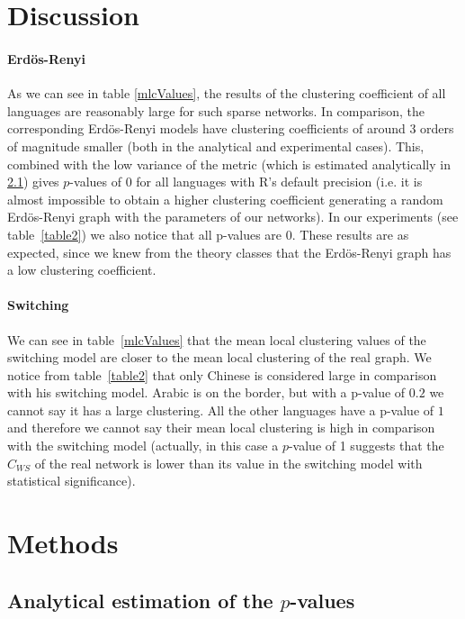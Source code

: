 \documentclass[paper=a4, fontsize=11pt]{scrartcl} %
\begin{document}
\section{Discussion}
\paragraph{Erdös-Renyi}
As we can see in table \ref{mlcValues}, the results of the clustering coefficient of all languages are reasonably large for such sparse networks. In comparison, the corresponding Erdös-Renyi models have clustering coefficients of around 3 orders of magnitude smaller (both in the analytical and experimental cases). This, combined with the low variance of the metric (which is estimated analytically in \ref{analytical}) gives $p$-values of 0 for all languages with R's default precision (i.e. it is almost impossible to obtain a higher clustering coefficient generating a random Erdös-Renyi graph with the parameters of our networks). In our experiments (see table~\ref{table2}) we also notice that all p-values are $0$.
These results are as expected, since we knew from the theory classes that the Erdös-Renyi graph has a low clustering coefficient.

\paragraph{Switching}
We can see in table~\ref{mlcValues} that the mean local clustering values of the switching model are closer to the mean local clustering of the real graph. We notice from table~\ref{table2} that only Chinese is considered large in comparison with his switching model. Arabic is on the border, but with a p-value of $0.2$ we cannot say it has a large clustering. All the other languages have a p-value of $1$ and therefore we cannot say their mean local clustering is high in comparison with the switching model (actually, in this case a $p$-value of 1 suggests that the $C_{WS}$ of the real network is lower than its value in the switching model with statistical significance).





\section{Methods}

\subsection{Analytical estimation of the $p$-values} \label{analytical}
\end{document}
